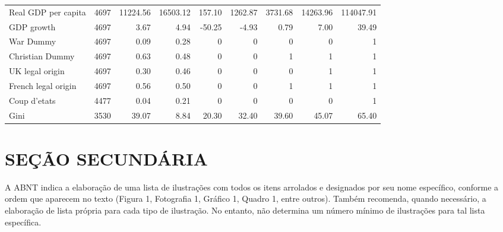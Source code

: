 \begin{table}[htbp]
\begin{tabular}{lrrrrrrrr}
        Real GDP per capita & 4697 & 11224.56 & 16503.12 & 157.10 & 1262.87 & 3731.68 & 14263.96 & 114047.91 \\
        GDP growth & 4697 & 3.67 & 4.94 & -50.25 & -4.93 & 0.79 & 7.00 & 39.49 \\
        War Dummy & 4697 & 0.09 & 0.28 & 0 & 0 & 0 & 0 & 1 \\
        Christian Dummy & 4697 & 0.63 & 0.48 & 0 & 0 & 1 & 1 & 1 \\
        UK legal origin & 4697 & 0.30 & 0.46 & 0 & 0 & 0 & 1 & 1 \\
        French legal origin & 4697 & 0.56 & 0.50 & 0 & 0 & 1 & 1 & 1 \\
        Coup d'etats & 4477 & 0.04 & 0.21 & 0 & 0 & 0 & 0 & 1 \\
        Gini & 3530 & 39.07 & 8.84 & 20.30 & 32.40 & 39.60 & 45.07 & 65.40 \\
        \bottomrule
    \end{tabular}
\end{table}


\section{SEÇÃO SECUNDÁRIA}

A ABNT indica a elaboração de uma lista de ilustrações com todos os itens arrolados e designados por seu nome específico, conforme a ordem que aparecem no texto (Figura 1, Fotografia 1, Gráfico 1, Quadro 1, entre outros). Também recomenda, quando necessário, a elaboração de lista própria para cada tipo de ilustração. No entanto, não determina um número mínimo de ilustrações para tal lista específica.

